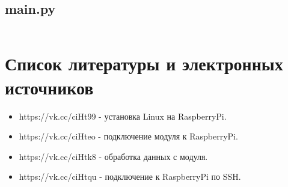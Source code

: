 \documentclass[a4paper, 14pt]{article}
\begin{document}
\subsection{main.py}
\normalsize
\inputminted[frame=single]{python}{../src/main.py}
\Large
\newpage
\section{Список литературы и электронных источников}

\begin{itemize}
	\item https://vk.cc/ciHt99 - установка Linux на RaspberryPi.
	\item https://vk.cc/ciHteo - подключение модуля к RaspberryPi.
	\item https://vk.cc/ciHtk8 - обработка данных с модуля.
	\item https://vk.cc/ciHtqu - подключение к RaspberryPi по SSH.
\end{itemize}
\end{document}
